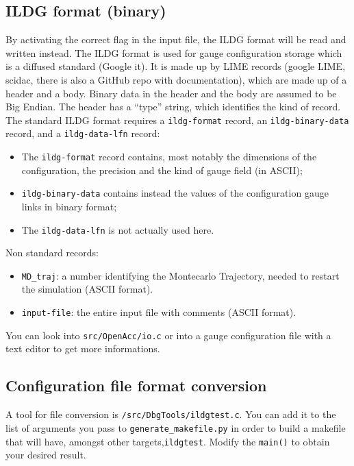 \subsection{ILDG format (binary)}
By activating the correct flag in the input file, the ILDG format will be read 
and written instead. The ILDG format is used for gauge configuration 
storage which is a diffused standard (Google it). It is made up by LIME records 
(google LIME, scidac, there is also a GitHub repo with documentation), which 
are made up of a header and a body. Binary data in the header and the body are 
assumed to be Big Endian. The header has a ``type'' string, which identifies 
the 
kind of record.
The standard ILDG format requires a \texttt{ildg-format} record, an 
\texttt{ildg-binary-data} record, and a \texttt{ildg-data-lfn} record:
\begin{itemize}
    \item The \texttt{ildg-format} record contains, most notably the dimensions of 
        the configuration, the precision and the kind of gauge field (in ASCII);
    \item \texttt{ildg-binary-data} contains instead the values of the 
        configuration gauge links in binary format;
    \item The \texttt{ildg-data-lfn} is not actually used here.
\end{itemize}
Non standard records:
\begin{itemize}
    \item \verb|MD_traj|: a number identifying the Montecarlo Trajectory, needed 
        to restart the simulation (ASCII format).
    \item \verb|input-file|: the entire input file with comments (ASCII format).
\end{itemize}
You can look into \verb|src/OpenAcc/io.c| or into a gauge configuration 
file with a text editor to get more informations.

\subsection{Configuration file format conversion}
A tool for file conversion is \verb|/src/DbgTools/ildgtest.c|. You can add it 
to the list of arguments you pass to \verb|generate_makefile.py| in order to 
build a makefile that will have, amongst other targets,\verb|ildgtest|.
Modify the \verb|main()| to obtain your desired result.

